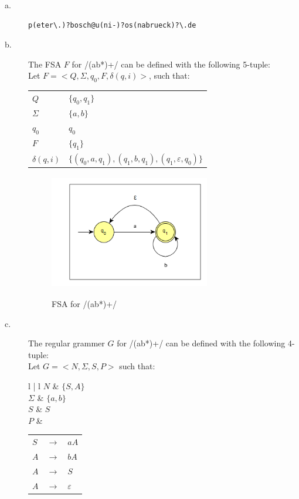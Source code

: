 \documentclass[11pt]{article}
\begin{document}
\begin{solution}
\begin{description}
	\item[a.] \begin{verbatim}p(eter\.)?bosch@u(ni-)?os(nabrueck)?\.de\end{verbatim}
	\item[b.] The FSA $F$ for /(ab*)+/ can be defined with the following 5-tuple:\\
	Let $F = <Q, \Sigma, q_{0}, F, \delta(q, i)>$, such that:

	\begin{tabular}{l | l}
		$Q$ & $\{ q_{0}, q_{1}\}$ \\
		$\Sigma$ & $\{a, b\}$ \\
		$q_{0}$ & $q_{0}$ \\
		$F$ & $\{ q_{1} \}$ \\
		$\delta(q, i)$ &  $\{ (q_{0},a,q_{1}), (q_{1}, b, q_{1}), (q_{1}, \varepsilon, q_{0}) \}$
	\end{tabular}

	\begin{figure}[h]
		\centering
		\includegraphics[width=7cm, height=5cm]{fsa} \\
		\caption{FSA for /(ab*)+/}
	\end{figure}
	\item[c.] The regular grammer $G$ for /(ab*)+/ can be defined with the following 4-tuple: \\
	Let $G = <N, \Sigma, S, P>$ such that:

	\begin{tabular}{l | l}
		$N$ & $\{ S, A\}$ \\
		$\Sigma$ & $\{a, b\}$ \\
		$S$ & $S$ \\
		$P$ & 
		\begin{tabular}{| l c l |} \hline 
			$S$ & $\rightarrow$ & $aA$ \\ 
			$A$ & $\rightarrow$ & $bA$ \\ 
			$A$ & $\rightarrow$ & $S$  \\
			$A$ & $\rightarrow$ & $\varepsilon$ \\
			\hline
		\end{tabular}
	\end{tabular}

\end{description}

\end{solution}
\end{document}
